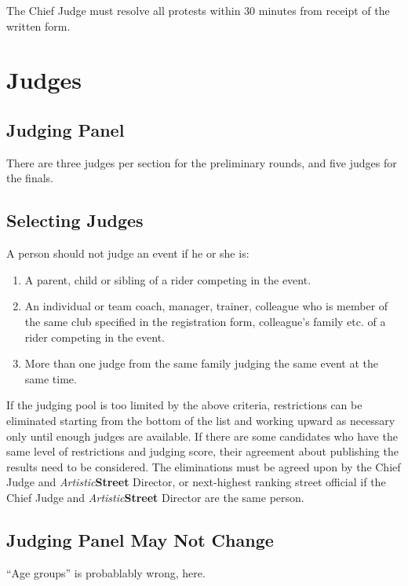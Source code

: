The Chief Judge must resolve all protests within 30 minutes from receipt of the written form.

\section{Judges}

\subsection{Judging Panel}

There are three judges  per section for the preliminary rounds, and five judges for the finals.

\subsection{Selecting Judges}
A person should not judge an event if he or she is:
\begin{enumerate}
\item A parent, child or sibling of a rider competing in the event.
\item An individual or team coach, manager, trainer, colleague who is member of the same club specified in the registration form, colleague's family etc. of a rider competing in the event.
\item More than one judge from the same family judging the same event at the same time.
\end{enumerate}

If the judging pool is too limited by the above criteria, restrictions can be eliminated starting from the bottom of the list and working upward as necessary only until enough judges are available.
If there are some candidates who have the same level of restrictions and judging score, their agreement about publishing the results need to be considered.
The eliminations must be agreed upon by the Chief Judge and \textit{Artistic}\textbf{Street} Director, or next-highest ranking street official if the Chief Judge and \textit{Artistic}\textbf{Street} Director are the same person.

\subsection{Judging Panel May Not Change}

\begin{framed}
``Age groups'' is probablably wrong, here.
\end{framed}

